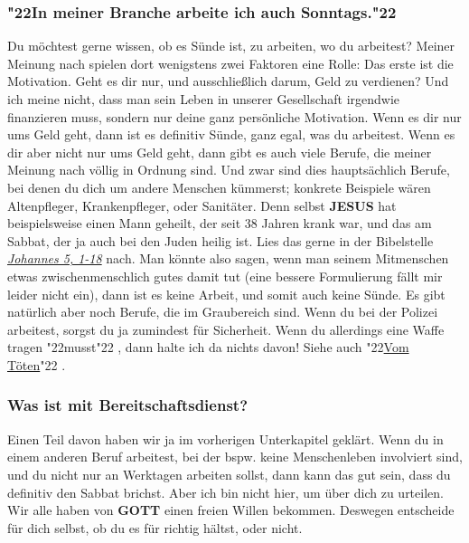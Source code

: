 \documentclass[10pt,a5paper]{article}
\newcommand{\Gott}[0]{\textbf{GOTT}}
\newcommand{\Jesus}[0]{\textbf{JESUS}}
\newcommand{\q}[1]{\char"22{#1}\char"22 }
\begin{document}
	\subsubsection{\q{In meiner Branche arbeite ich auch Sonntags.}}
		Du m\"ochtest gerne wissen,
		ob es S\"unde ist,
		zu arbeiten,
		wo du arbeitest?
		Meiner Meinung nach spielen dort wenigstens zwei Faktoren eine Rolle:
		Das erste ist die Motivation.
		Geht es dir nur,
		und ausschlie{\ss}lich darum,
		Geld zu verdienen?
		Und ich meine nicht,
		dass man sein Leben in unserer Gesellschaft irgendwie finanzieren muss,
		sondern nur deine ganz pers\"onliche Motivation.
		Wenn es dir nur ums Geld geht,
		dann ist es definitiv S\"unde,
		ganz egal,
		was du arbeitest.
		Wenn es dir aber nicht nur ums Geld geht,
		dann gibt es auch viele Berufe,
		die meiner Meinung nach v\"ollig in Ordnung sind.
		Und zwar sind dies haupts\"achlich Berufe,
		bei denen du dich um andere Menschen k\"ummerst;
		konkrete Beispiele w\"aren
		Altenpfleger,
		Krankenpfleger,
		oder Sanit\"ater.
		Denn selbst {\Jesus} hat beispielsweise einen Mann geheilt,
		der seit 38 Jahren krank war,
		und das am Sabbat,
		der ja auch bei den Juden heilig ist.
		Lies das gerne in der Bibelstelle \textit{\href{https://www.die-bibel.de/bibeln/online-bibeln/lesen/LU17/JHN.5/Johannes-5}{Johannes 5, 1-18}} nach.
		Man k\"onnte also sagen,
		wenn man seinem Mitmenschen etwas zwischenmenschlich gutes damit tut
		(eine bessere Formulierung f\"allt mir leider nicht ein),
		dann ist es keine Arbeit,
		und somit auch keine S\"unde.
		Es gibt nat\"urlich aber noch Berufe,
		die im Graubereich sind.
		Wenn du bei der Polizei arbeitest,
		sorgst du ja zumindest f\"ur Sicherheit.
		Wenn du allerdings eine Waffe tragen \q{musst},
		dann halte ich da nichts davon!
		Siehe auch \q{\hyperref[VomToeten]{Vom T\"oten}}.

	\subsubsection{Was ist mit Bereitschaftsdienst?}
		Einen Teil davon haben wir ja im vorherigen Unterkapitel gekl\"art.
		Wenn du in einem anderen Beruf arbeitest,
		bei der bspw. keine Menschenleben involviert sind,
		und du nicht nur an Werktagen arbeiten sollst,
		dann kann das gut sein,
		dass du definitiv den Sabbat brichst.
		Aber ich bin nicht hier,
		um \"uber dich zu urteilen.
		Wir alle haben von {\Gott} einen freien Willen bekommen.
		Deswegen entscheide f\"ur dich selbst,
		ob du es f\"ur richtig h\"altst,
		oder nicht.
\end{document}
